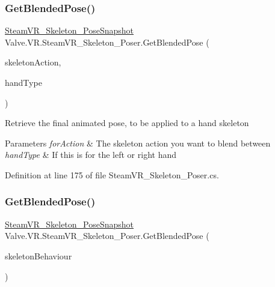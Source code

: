 \subsubsection{\texorpdfstring{GetBlendedPose()}{GetBlendedPose()}\hspace{0.1cm}{\footnotesize\ttfamily [1/2]}}
{\footnotesize\ttfamily \mbox{\hyperlink{class_valve_1_1_v_r_1_1_steam_v_r___skeleton___pose_snapshot}{Steam\+V\+R\+\_\+\+Skeleton\+\_\+\+Pose\+Snapshot}} Valve.\+V\+R.\+Steam\+V\+R\+\_\+\+Skeleton\+\_\+\+Poser.\+Get\+Blended\+Pose (\begin{DoxyParamCaption}\item[{\mbox{\hyperlink{class_valve_1_1_v_r_1_1_steam_v_r___action___skeleton}{Steam\+V\+R\+\_\+\+Action\+\_\+\+Skeleton}}}]{skeleton\+Action,  }\item[{\mbox{\hyperlink{namespace_valve_1_1_v_r_a82e5bf501cc3aa155444ee3f0662853f}{Steam\+V\+R\+\_\+\+Input\+\_\+\+Sources}}}]{hand\+Type }\end{DoxyParamCaption})}



Retrieve the final animated pose, to be applied to a hand skeleton 


\begin{DoxyParams}{Parameters}
{\em for\+Action} & The skeleton action you want to blend between\\
\hline
{\em hand\+Type} & If this is for the left or right hand\\
\hline
\end{DoxyParams}


Definition at line 175 of file Steam\+V\+R\+\_\+\+Skeleton\+\_\+\+Poser.\+cs.

\mbox{\label{class_valve_1_1_v_r_1_1_steam_v_r___skeleton___poser_a4033ee62539b088df573ff5785cb7bd7}} 
\subsubsection{\texorpdfstring{GetBlendedPose()}{GetBlendedPose()}\hspace{0.1cm}{\footnotesize\ttfamily [2/2]}}
{\footnotesize\ttfamily \mbox{\hyperlink{class_valve_1_1_v_r_1_1_steam_v_r___skeleton___pose_snapshot}{Steam\+V\+R\+\_\+\+Skeleton\+\_\+\+Pose\+Snapshot}} Valve.\+V\+R.\+Steam\+V\+R\+\_\+\+Skeleton\+\_\+\+Poser.\+Get\+Blended\+Pose (\begin{DoxyParamCaption}\item[{\mbox{\hyperlink{class_valve_1_1_v_r_1_1_steam_v_r___behaviour___skeleton}{Steam\+V\+R\+\_\+\+Behaviour\+\_\+\+Skeleton}}}]{skeleton\+Behaviour }\end{DoxyParamCaption})}



